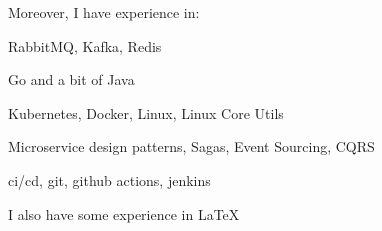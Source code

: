 Moreover, I have experience in:
\begin{bulist}
\item RabbitMQ, Kafka, Redis
\item Go and a bit of Java
\item Kubernetes, Docker, Linux, Linux Core Utils
\item Microservice design patterns, Sagas, Event Sourcing, CQRS
\item ci/cd, git, github actions, jenkins
\end{bulist}
I also have some experience in \LaTeX
